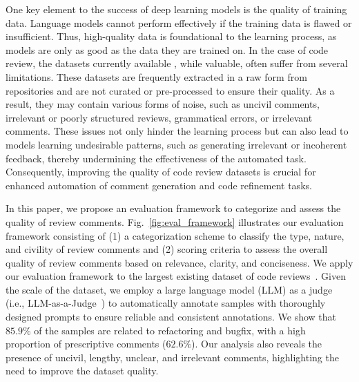 One key element to the success of deep learning models is the quality of training data. Language models cannot perform effectively if the training data is flawed or insufficient. Thus, high-quality data is foundational to the learning process, as models are only as good as the data they are trained on. In the case of code review, the datasets currently available \cite{li2022automating, sghaier2023multi}, while valuable, often suffer from several limitations. These datasets are frequently extracted in a raw form from repositories and are not curated or pre-processed to ensure their quality. As a result, they may contain various forms of noise, such as uncivil comments, irrelevant or poorly structured reviews, grammatical errors, or irrelevant comments. These issues not only hinder the learning process but can also lead to models learning undesirable patterns, such as generating irrelevant or incoherent feedback, thereby undermining the effectiveness of the automated task. Consequently, improving the quality of code review datasets is crucial for enhanced automation of comment generation and code refinement tasks.


In this paper, we propose an evaluation framework to categorize and assess the quality of review comments.
Fig.~\ref{fig:eval_framework} illustrates our evaluation framework consisting of (1) a categorization scheme to classify the type, nature, and civility of review comments and (2) scoring criteria to assess the overall quality of review comments based on relevance, clarity, and conciseness.
We apply our evaluation framework to the largest existing dataset of code reviews~\cite{li2022automating}.
Given the scale of the dataset, we employ a large language model (LLM) as a judge (i.e., LLM-as-a-Judge~\cite{zheng2023judging}) to automatically annotate samples with thoroughly designed prompts to ensure reliable and consistent annotations.
We show that $85.9\%$ of the samples are related to refactoring and bugfix, with a high proportion of prescriptive comments ($62.6\%$). 
Our analysis also reveals the presence of uncivil, lengthy, unclear, and irrelevant comments, highlighting the need to improve the dataset quality.

